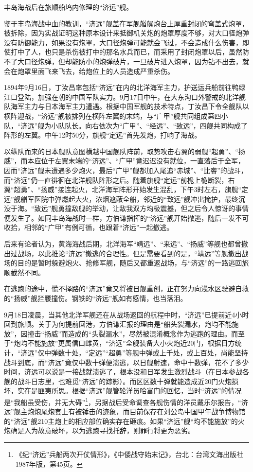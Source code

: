 \documentclass[12pt,UTF8]{ctexbook}
\begin{document}
丰岛海战后在旅顺船坞内修理的“济远”舰。

鉴于丰岛海战中血的教训，“济远”舰盖在军舰艏艉炮台上厚重封闭的穹盖式炮罩，被拆除，因为实战证明这种原本设计来抵御机关炮的炮罩厚度不够，对大口径炮弹没有防御能力，如果没有炮罩，大口径炮弹可能就会飞过，不会造成什么伤害，即使打中了人，也只是杀伤被打中的那名水兵而已，而采用了封闭炮罩以后，虽然防不了大口径炮弹，但却能防小的炮弹破片，一旦破片进入炮罩，因为钻不出去，就会在炮罩里面飞来飞去，给炮位上的人员造成严重杀伤。

1894年9月16日，丁汝昌率包括“济远”在内的北洋海军主力，护送运兵船前往鸭绿江口登陆，加强在朝的中国军队实力。9月17日中午，在大东沟口外警戒的北洋舰队海军主力与日本海军主力遭遇。根据中国军舰的技术特点，丁汝昌下令全舰队以横阵迎战，“济远”舰被排列在横阵左翼的末端，与“广甲”舰共同组成第四小队，“济远”舰为小队队长。向右依次为“广甲”、“经远”、“致远”，四舰共同构成了阵形的左翼。中午12时50分，旗舰“定远”首先发炮，打响了海战。

以纵队而来的日本舰队意图横越中国舰队阵前，取势攻击右翼的弱舰“超勇”、“扬威”，而本应位于左翼末端的“济远”、“广甲”竟迟迟没有就位，一直落后于全军，因而“济远”舰未遭遇多少炮火，最后“广甲”舰都加入尾追“赤城”、“比睿”的战斗，而“济远”仍一直徘徊在北洋舰队阵形之后。随着旗舰“定远”前桅上桅断裂，右翼“超勇”、“扬威”接连起火，北洋海军阵形开始发生混乱，下午3时左右，旗舰“定远”舰艏军医院中弹燃起大火，浓烟遮蔽全船，邻近的“致远”舰冲出掩护，最终沉没于海。“致远”舰勇撞敌舰的举动，让敌我双方均极震撼，但之后令人惊讶的事情便发生了。如同丰岛海战时一样，方伯谦指挥的“济远”舰开始撤逃，随后一发不可收拾，相邻的“广甲”有例可循，也跟着“济远”一起撤逃。

后来有论者认为，黄海海战后期，北洋海军“靖远”、“来远”、“扬威”等舰也都曾撤出过战场，以此推论“济远”撤逃的合理性。但是需要看到的是，“靖远”等舰撤出战场的目的是暂时躲避炮火、抢修军舰，随后又都重返战场，与“济远”的一路逃回旅顺截然不同。

在逃跑的途中，慌不择路的“济远”竟又将被日舰重创，正在努力向浅水区驶避自救的“扬威”舰拦腰撞伤。钢铁的“济远”舰如有感情，也当落泪。

9月18日凌晨，当其他北洋军舰还在从战场返回的航程中时，“济远”已提前近4小时回到旅顺。关于为何提前回港，方伯谦汇报的理由是“船头裂漏水，炮均不能施放”，因撞击“扬威”而造成的“头裂漏水”，尽然被混淆概念作为逃跑的理由。而至于“炮均不能施放”更属信口雌黄，“济远”全舰装备大小火炮近20门，根据日方统计，“济远”仅中弹数十处，“定远”“超勇”等舰中弹或上千处，或上百处，尚能坚持战斗到底，而“济远”竟仅中数十弹便溃逃，以日舰射速，命中十数弹，花不了多少时间，济远可以说是一接战就溃逃了，根本没和日军发生激烈战斗（在日本参战各舰的战斗日志里，也难觅“济远”的踪影）。而区区数十弹就能造成近20门火炮损坏，实在是匪夷所思。根据“济远”舰管轮洋员哈富门的回忆，当时“济远”的情况是“我船虽受伤，并无大碍”\footnote{《纪“济远”兵船两次开仗情形》，《中倭战守始末记》，台北：台湾文海出版社1987年版，第45页。}，另据战后受命调查各舰伤情的洋员戴乐尔报告，“济远”舰主炮炮尾炮套上有被锤击的迹象，而目前保存在刘公岛中国甲午战争博物馆的“济远”舰210主炮上的相应部位确实存在砸痕。如果“济远”舰“均不能施放”的火炮确是人为故意破坏，以为逃跑寻找托辞，则罪行将更为恶劣。
\end{document}
